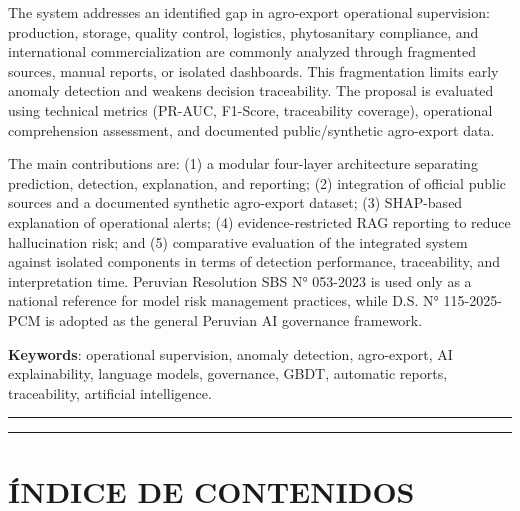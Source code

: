 The system addresses an identified gap in agro-export operational
supervision: production, storage, quality control, logistics,
phytosanitary compliance, and international commercialization are
commonly analyzed through fragmented sources, manual reports, or
isolated dashboards. This fragmentation limits early anomaly detection
and weakens decision traceability. The proposal is evaluated using
technical metrics (PR-AUC, F1-Score, traceability coverage), operational
comprehension assessment, and documented public/synthetic agro-export
data.

The main contributions are: (1) a modular four-layer architecture
separating prediction, detection, explanation, and reporting; (2)
integration of official public sources and a documented synthetic
agro-export dataset; (3) SHAP-based explanation of operational alerts;
(4) evidence-restricted RAG reporting to reduce hallucination risk; and
(5) comparative evaluation of the integrated system against isolated
components in terms of detection performance, traceability, and
interpretation time. Peruvian Resolution SBS N° 053-2023 is used only as
a national reference for model risk management practices, while D.S. N°
115-2025-PCM is adopted as the general Peruvian AI governance framework.

\textbf{Keywords}: operational supervision, anomaly detection,
agro-export, AI explainability, language models, governance, GBDT,
automatic reports, traceability, artificial intelligence.

\begin{center}\rule{0.5\linewidth}{0.5pt}\end{center}

\begin{center}\rule{0.5\linewidth}{0.5pt}\end{center}

\section{ÍNDICE DE CONTENIDOS}\label{uxedndice-de-contenidos}


